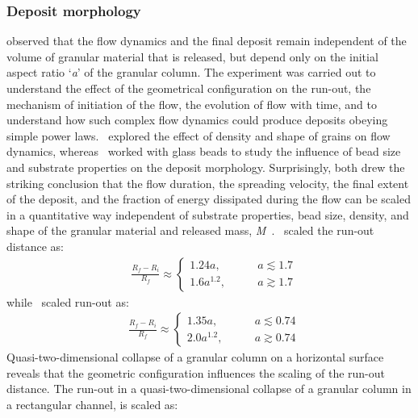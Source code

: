 \subsubsection{Deposit morphology}
\citet{Lajeunesse2005} observed that the flow dynamics and the final deposit 
remain independent of the volume of granular material that is released, but 
depend only on the initial aspect ratio `\textit{a}' of the granular column. 
The experiment was carried out to understand the effect of the geometrical 
configuration on the run-out, the mechanism of initiation of the flow, the 
evolution of flow with time, and to understand how such complex flow dynamics 
could produce deposits obeying simple power laws.~\citet{Lube2005} explored the 
effect of density and shape of grains on flow dynamics, 
whereas~\citet{Lajeunesse2004} worked with glass beads to study the influence 
of bead size and substrate properties on the deposit morphology. Surprisingly, 
both drew the striking conclusion that the flow duration, the spreading 
velocity, the final extent of the deposit, and the fraction of energy 
dissipated during the flow can be scaled in a quantitative way independent of 
substrate properties, bead size, density, and shape of the granular material 
and released mass, \textit{M}~\citep{Lajeunesse2005}.~\citet{Lube2005} scaled 
the run-out distance as:
\begin{align}
& \frac{\textit{R}_{\textit{f}}- 
\textit{R}_{\textit{i}}}{\textit{R}_{\textit{f}}} \approx
\begin{cases} 
1.24\textit{a}, \qquad &\textit{a} \lesssim 1.7 \\
1.6\textit{a}^{1.2}, \qquad &\textit{a} \gtrsim 1.7
\end{cases}
\end{align}
while~\citet{Lajeunesse2004} scaled run-out as:
\begin{align}
& \frac{\textit{R}_{\textit{f}}- 
\textit{R}_{\textit{i}}}{\textit{R}_{\textit{f}}} \approx
\begin{cases} 
1.35\textit{a}, \qquad &\textit{a} \lesssim 0.74 \\
2.0\textit{a}^{1.2}, \qquad &\textit{a} \gtrsim 0.74
\end{cases}
\end{align} 
Quasi-two-dimensional collapse of a granular column on a horizontal 
surface~\citep{Lajeunesse2005} reveals that the geometric configuration 
influences the scaling of the run-out distance. The run-out in a 
quasi-two-dimensional collapse of a granular column in a rectangular channel, 
is scaled as: 
